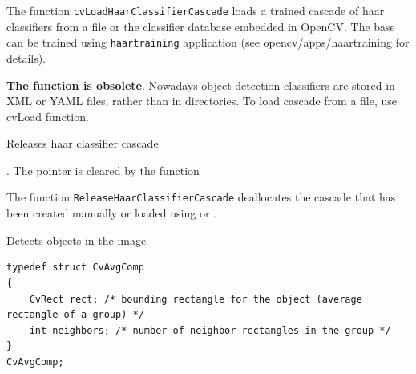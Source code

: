 The function \texttt{cvLoadHaarClassifierCascade} loads a trained cascade
of haar classifiers from a file or the classifier database embedded in
OpenCV. The base can be trained using \texttt{haartraining} application
(see opencv/apps/haartraining for details).

\textbf{The function is obsolete}. Nowadays object detection classifiers are stored in XML or YAML files, rather than in directories. To load cascade from a file, use cvLoad function.

\label{ReleaseHaarClassifierCascade}

Releases haar classifier cascade


\begin{description}
. The pointer is cleared by the function
\end{description}

The function \texttt{ReleaseHaarClassifierCascade} deallocates the cascade that has been created manually or loaded using  or .

\label{HaarDetectObjects}

Detects objects in the image

\begin{lstlisting}
typedef struct CvAvgComp
{
    CvRect rect; /* bounding rectangle for the object (average rectangle of a group) */
    int neighbors; /* number of neighbor rectangles in the group */
}
CvAvgComp;
\end{lstlisting}


